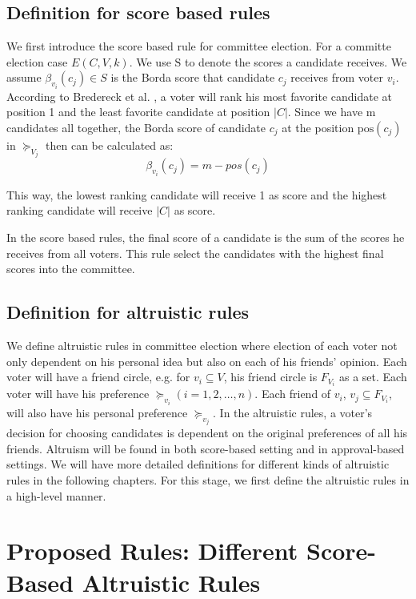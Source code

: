 \documentclass{article}
\begin{document}
\subsection{Definition for score based rules}
We first introduce the score based rule for committee election. For a committe election case $E(C,V,k)$. 
We use  $\mathrm{S}$ to denote the scores a candidate receives. We assume $\beta_{v_i}(c_j) \in S$ is the Borda score that candidate $c_j$ receives from voter $v_i$. According to Bredereck et al. \cite{Bredereck2018}, a voter will rank his most favorite candidate at position 1 and the least favorite candidate at position  $\vert C \vert$. Since we have $\mathrm{m}$ candidates all together, the Borda score of candidate $c_j$ at the position $\mathrm{pos}{(c_j)}$ in  $\succeq_{V_j}$ then can be calculated as:
\begin{equation}
\beta_{v_i}(c_j) =  m - {pos}{(c_j)} \label{con:bordascore}  \end{equation}

This way, the lowest ranking candidate will receive 1 as score and the highest ranking candidate will receive $\vert C \vert$ as score. 

In the score based rules, the final score of a candidate is the sum of the scores he receives from all voters. This rule select the candidates with the highest final scores into the committee.

\subsection{Definition for altruistic rules}
We define altruistic rules in committee election where election of each voter not only dependent on his personal idea but also on each of his friends' opinion. Each voter will have a friend circle, e.g. for $v_i\subseteq V$, his friend circle is $F_{V_i}$ as a set. Each voter will have his preference $\succeq_{v_i} (i = 1, 2, \dots , n)$.  Each friend of $v_i$, $v_j\subseteq F_{V_i}$, will also have his personal preference $\succeq_{v_j}$. In the altruistic rules, a voter's decision for choosing candidates is dependent on the original preferences of all his friends. Altruism will be found in both score-based setting and in approval-based settings. We will have more detailed definitions for different kinds of altruistic rules in the following chapters. For this stage, we first define the altruistic rules in a high-level manner. 

\section{Proposed Rules: Different Score-Based Altruistic Rules}
\end{document}
